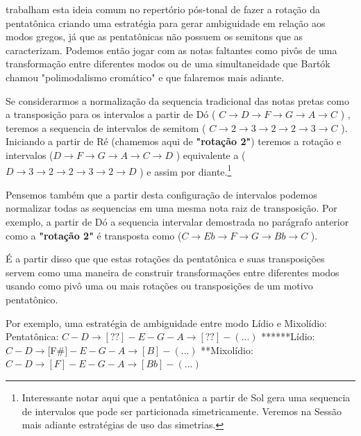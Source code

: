 \documentclass[
	12pt,				%
	openright,			%
	twoside,			%
	a4paper,			%
	english,			%
	french,				%
	spanish,			%
	brazil				%
	]{abntex2}
\begin{document}
 trabalham esta ideia comum no repertório pós-tonal de fazer a rotação da pentatônica criando uma estratégia para gerar ambiguidade em relação aos modos gregos, já que as pentatônicas não possuem os semitons que as caracterizam. Podemos então jogar com as notas faltantes como pivôs de uma transformação entre diferentes modos ou de uma simultaneidade que Bartók chamou "polimodalismo cromático" e que falaremos mais adiante. 

Se considerarmos a normalização da sequencia tradicional das notas pretas como a transposição para os intervalos a partir de Dó ( $C \rightarrow  D \rightarrow F \rightarrow G \rightarrow A \rightarrow C $ ) , teremos a sequencia de intervalos de semitom ( $C \rightarrow 2 \rightarrow  3 \rightarrow 2 \rightarrow 2  \rightarrow 3 \rightarrow C $ ). Iniciando a partir de Ré (chamemos aqui de \textbf{"rotação 2"}) teremos a rotação e intervalos ($D \rightarrow F \rightarrow G \rightarrow A \rightarrow C \rightarrow D $ ) equivalente a ( $  D \rightarrow 3 \rightarrow  2 \rightarrow 2 \rightarrow 3  \rightarrow 2 \rightarrow D $ ) e assim por diante.\footnote{Interessante notar aqui que a pentatônica a partir de Sol gera uma sequencia de intervalos que pode ser particionada simetricamente. Veremos na Sessão mais adiante estratégias de uso das simetrias.}

Pensemos também que a partir desta configuração de intervalos podemos normalizar todas as sequencias em uma mesma nota raiz de transposição. Por exemplo, a partir de Dó a sequencia intervalar demostrada no parágrafo anterior como a \textbf{"rotação 2"} é transposta como ($C \rightarrow Eb \rightarrow F \rightarrow G \rightarrow Bb \rightarrow C $ ).

É a partir disso que  que estas rotações da pentatônica e suas transposições servem como uma maneira de construir transformações entre diferentes modos usando como pivô uma ou mais rotações ou transposições de um motivo pentatônico. 

Por exemplo, uma estratégia de ambiguidade entre modo Lídio e Mixolídio:
\linebreak
Pentatônica: $ C - D \rightarrow [ ?? ] - E - G - A \rightarrow [ ?? ] - (...) $  \linebreak
******Lídio: $ C - D \rightarrow [ $F\#$ ] - E - G - A \rightarrow [ B ] - (...) $  \linebreak
**Mixolídio: $ C - D \rightarrow [ F ] - E - G - A \rightarrow [ Bb ] - (...) $  \linebreak
\end{document}
